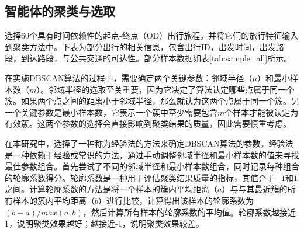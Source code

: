 \subsection{智能体的聚类与选取}


选择60个具有时间依赖性的起点-终点（OD）出行旅程，并将它们的旅行特征输入到聚类方法中。下表为部分出行的相关信息，包含出行ID，出发时间，出发路段，到达路段，与公共交通的可达性。部分样本数据如表\ref{tab:sample_all}所示。

\renewcommand{\arraystretch}{1.2}
\begin{table}[htbp]
\centering
\caption{智能体部分样本数据示例}
\label{tab:sample_all}

\begin{adjustbox}{center}
\end{adjustbox}
\end{table}


在实施DBSCAN算法的过程中，需要确定两个关键参数：邻域半径（$\mu$）和最小样本数（$m$）。邻域半径的选取至关重要，因为它决定了算法认定哪些点属于同一个簇。如果两个点之间的距离小于邻域半径，那么就认为这两个点属于同一个簇。另一个关键参数是最小样本数，它表示一个簇中至少需要包含$m$个样本才能被认定为有效簇。这两个参数的选择会直接影响到聚类结果的质量，因此需要慎重考虑。

在本研究中，选择了一种称为经验法的方法来确定DBSCAN算法的参数。经验法是一种依赖于经验或常识的方法，通过手动调整邻域半径和最小样本数的值来寻找最佳参数组合。首先尝试了不同的邻域半径和最小样本数组合，同时记录每种组合的轮廓系数得分。轮廓系数是一种用于评估聚类结果质量的指标，其值介于$-1$和$1$之间。计算轮廓系数的方法是将一个样本的簇内平均距离（$a$）与与其最近簇的所有样本的簇内平均距离（$b$）进行比较，计算得出该样本的轮廓系数为${(b-a)} / {max(a,b)}$，然后计算所有样本的轮廓系数的平均值。轮廓系数越接近1，说明聚类效果越好；越接近-1，说明聚类效果较差。

